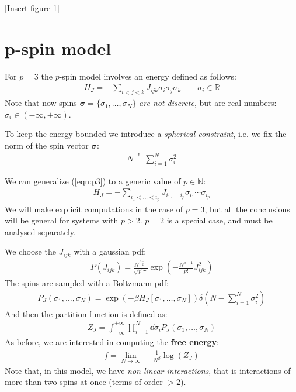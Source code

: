 \documentclass[../template.tex]{subfiles}
\begin{document}
[Insert figure 1]

\section{p-spin model}
For $p=3$ the $p$-spin model involves an energy defined as follows:
\begin{align} \label{eqn:p3}
    H_J = -\sum_{i < j < k} J_{ijk} \sigma_i \sigma_j \sigma_k \qquad \sigma_i \in \mathbb{R}
\end{align}
Note that now spins $\bm{\sigma} = \{\sigma_1,\dots,\sigma_N\}$ \textit{are not discrete}, but are real numbers: $\sigma_i \in (-\infty,+\infty)$.

To keep the energy bounded we introduce a \textit{spherical constraint}, i.e. we fix the norm of the spin vector $\bm{\sigma}$: 
\begin{align*}
    N \overset{!}{=} \sum_{i=1}^N \sigma_i^2
\end{align*} 

We can generalize (\ref{eqn:p3}) to a generic value of $p \in \mathbb{N}$:
\begin{align*}
    H_J = -\sum_{i_1 < \dots < i_p} J_{i_1,\dots,i_p} \sigma_{i_1} \cdots \sigma_{i_p}
\end{align*} 
We will make explicit computations in the case of $p=3$, but all the conclusions will be general for systems with $p>2$. $p=2$ is a special case, and must be analysed separately.

We choose the $J_{ijk}$ with a gaussian pdf:
\begin{align*}
    P(J_{ijk}) = \frac{N^{\frac{p-1}{2} }}{\sqrt{p! \pi}} \exp\left(-\frac{N^{p-1}}{p!} J_{ijk}^2 \right) 
\end{align*} 
The spins are sampled with a Boltzmann pdf:
\begin{align*}
    P_J(\sigma_1, \dots, \sigma_N) = \exp(-\beta H_J[\sigma_1, \dots, \sigma_N]) \delta\left(N- \sum_{i=1}^N \sigma_i^2\right)
\end{align*}
And then the partition function is defined as:
\begin{align*}
    Z_J = \int_{-\infty}^{+\infty} \prod_{i=1}^N \dd{\sigma_i} P_J(\sigma_1, \dots, \sigma_N)
\end{align*}
As before, we are interested in computing the \textbf{free energy}:
\begin{align*}
    f = \lim_{N \to \infty} -\frac{1}{N^\beta} \overline{\log(Z_J)} 
\end{align*} 
Note that, in this model, we have \textit{non-linear interactions}, that is interactions of more than two spins at once (terms of order $>2$).
\end{document}
